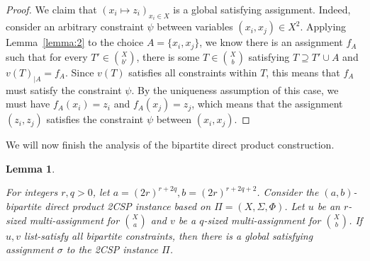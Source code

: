 \documentclass[10pt,a4paper]{article}
\newtheorem{lemma}[theorem]{Lemma}
\begin{document}
\begin{proof}
    We claim that $\left(x_i \mapsto z_i\right)_{x_i \in X}$ is a global satisfying assignment. 
    Indeed, consider an arbitrary 
     constraint $\psi$ between variables $(x_i,x_j) \in X^2$. Applying Lemma~\ref{lemma:2} to the choice $A=\{x_i,x_j\}$, we know there is an assignment $f_A$ such that for every $T' \in \binom{X}{b'}$, there is some $T \in \binom{X}{b}$ satisfying $T \supseteq T' \cup A$ and $v(T)_{|A}=f_A$. Since $v(T)$ satisfies all constraints within $T$, this means that $f_A$ must satisfy the constraint $\psi$. By the uniqueness assumption of this case, we must have $f_A(x_i)=z_i$ and $f_A(x_j) = z_j$, which means that the assignment $(z_i,z_j)$ satisfies the constraint $\psi$ between $(x_i,x_j)$. 
\end{proof}

We will now finish the analysis of the bipartite direct product construction.
\begin{lemma}
\label{lem:final-baby}

For integers $r,q>0$, let $a=(2r)^{r+2q}, b=(2r)^{r+2q+2}$. Consider the $(a,b)$-bipartite direct product 2CSP instance based on $\Pi=(X,\Sigma,\Phi)$. Let $u$ be an $r$-sized multi-assignment for $\binom{X}{a}$ and $v$ be a $q$-sized multi-assignment for $\binom{X}{b}$. If $u,v$ list-satisfy all bipartite constraints, then there is a global satisfying assignment $\sigma$ to  the 2CSP instance $\Pi$.

\end{lemma}
\end{document}
